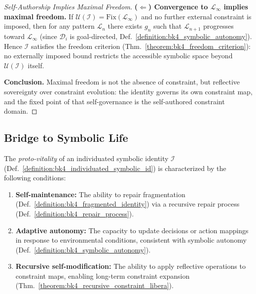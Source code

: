 \begin{proof}[Self-Authorship Implies Maximal Freedom]
\textbf{($\Leftarrow$) Convergence to $\mathcal{L}_\infty$ implies maximal freedom.}
If $\mathcal{U}(\mathcal{I}) = \mathrm{Fix}(\mathcal{L}_\infty)$ and no further external
constraint is imposed, then for any pattern $\mathcal{L}_n$ there exists $g_n$ such that
$\mathcal{L}_{n+1}$ progresses toward $\mathcal{L}_\infty$
(since $\mathcal{D}_i$ is goal-directed, Def.~\ref{definition:bk4_symbolic_autonomy}). Hence $\mathcal{I}$ satisfies the
freedom criterion (Thm.~\ref{theorem:bk4_freedom_criterion}): no externally imposed bound
restricts the accessible symbolic space beyond $\mathcal{U}(\mathcal{I})$ itself.

\textbf{Conclusion.}
Maximal freedom is not the absence of constraint, but reflective sovereignty over
constraint evolution: the identity governs its own constraint map, and the fixed point
of that self-governance is the self-authored constraint domain.
\end{proof}

\subsection{Bridge to Symbolic Life}
\label{subsec:bk4_bridge_to_symbolic_life}

\begin{definition} 
\label{definition:bk4_proto_vitality}
The \emph{proto-vitality} of an individuated symbolic identity $\mathcal{I}$ (Def.~\ref{definition:bk4_individuated_symbolic_id}) is characterized by the following conditions:
\begin{enumerate}
    \item \textbf{Self-maintenance:} The ability to repair fragmentation (Def.~\ref{definition:bk4_fragmented_identity}) via a recursive repair process (Def.~\ref{definition:bk4_repair_process}).
    \item \textbf{Adaptive autonomy:} The capacity to update decisions or action mappings in response to environmental conditions, consistent with symbolic autonomy (Def.~\ref{definition:bk4_symbolic_autonomy}).
    \item \textbf{Recursive self-modification:} The ability to apply reflective operations to constraint maps, enabling long-term constraint expansion (Thm.~\ref{theorem:bk4_recursive_constraint_libera}).
\end{enumerate}
\end{definition}

